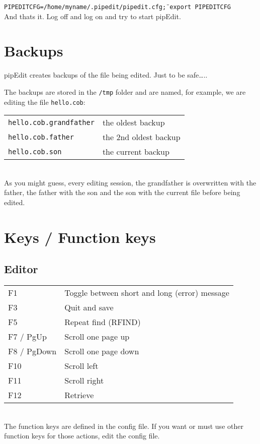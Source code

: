 \documentclass{report}
\begin{document}
\texttt{PIPEDITCFG=\"/home/myname/.pipedit/pipedit.cfg\" ; export PIPEDITCFG}
\\
\break
And thats it. Log off and log on and try to start pipEdit.

\chapter{Backups}

pipEdit creates backups of the file being edited. Just to be safe…..

The backups are stored in the \texttt{/tmp}
folder and are named, for example, we are editing the file 
\texttt{hello.cob}: \\
\break
\begin{tabular}{l l}
\texttt{hello.cob.grandfather}  & the oldest backup \\
\texttt{hello.cob.father} & the 2nd oldest backup \\
\texttt{hello.cob.son} & the current backup \\
\end{tabular} \\
\break
As you might guess, every editing session, the grandfather is overwritten with the father, the father with the son and the son with the current file before being edited.


\chapter{Keys / Function keys}

\section{Editor}

\begin{tabular}{l l}
F1 & Toggle between short and long (error) message \\
F3 & Quit and save \\
F5 & Repeat find (RFIND) \\
F7 / PgUp & Scroll one page up \\
F8 / PgDown & Scroll one page down \\
F10 & Scroll left \\
F11 & Scroll right \\
F12 & Retrieve \\
\end{tabular}
\\

The function keys are defined in the config file. If you want or must
use other function keys for those actions, edit the config file. \\
\end{document}
